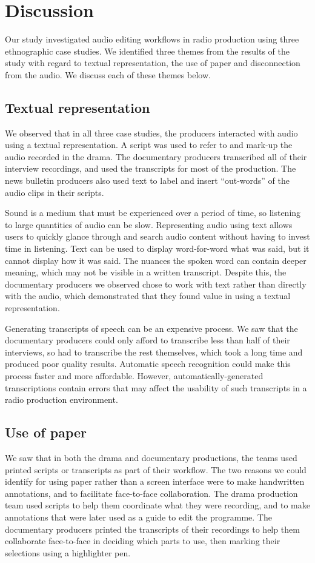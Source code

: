 \section{Discussion}\label{sec:ethno-discussion}
Our study investigated audio editing workflows in radio production using three ethnographic case studies. We identified
three themes from the results of the study with regard to textual representation, the use of paper and disconnection
from the audio. We discuss each of these themes below.

\subsection{Textual representation}
We observed that in all three case studies, the producers interacted with audio using a textual representation. A
script was used to refer to and mark-up the audio recorded in the drama. The documentary producers transcribed all of
their interview recordings, and used the transcripts for most of the production. The news bulletin producers also used
text to label and insert ``out-words'' of the audio clips in their scripts.

Sound is a medium that must be experienced over a period of time, so listening to large quantities of audio can be
slow. Representing audio using text allows users to quickly glance through and search audio content without having to
invest time in listening. Text can be used to display word-for-word what was said, but it cannot display how it was
said. The nuances the spoken word can contain deeper meaning, which may not be visible in a written
transcript. Despite this, the documentary producers we observed chose to work with text rather than directly with the
audio, which demonstrated that they found value in using a textual representation.

Generating transcripts of speech can be an expensive process. We saw that the documentary producers could only afford
to transcribe less than half of their interviews, so had to transcribe the rest themselves, which took a long time and
produced poor quality results.  Automatic speech recognition \citep{Lee1999a} could make this process faster
and more affordable. However, automatically-generated transcriptions contain errors that may affect the usability of
such transcripts in a radio production environment.

\subsection{Use of paper}
We saw that in both the drama and documentary productions, the teams used printed scripts or transcripts as part of
their workflow. The two reasons we could identify for using paper rather than a screen interface were to make
handwritten annotations, and to facilitate face-to-face collaboration.  The drama production team used scripts to help
them coordinate what they were recording, and to make annotations that were later used as a guide to edit the
programme. The documentary producers printed the transcripts of their recordings to help them collaborate face-to-face
in deciding which parts to use, then marking their selections using a highlighter pen.

